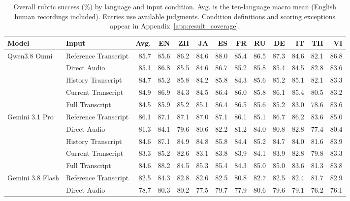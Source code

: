 \begin{table}[htbp]
\centering
\caption{Overall rubric success (\%) by language and input condition. Avg. is the ten-language macro mean (English human recordings included). Entries use available judgments. Condition definitions and scoring exceptions appear in Appendix~\ref{app:result_coverage}.}
\label{tab:rubric_conditions}
\begingroup
\fontsize{8.2}{9.1}\selectfont
\setlength{\tabcolsep}{1pt}
\renewcommand{\arraystretch}{1.06}
\begin{tabular*}{\linewidth}{@{}ll@{\extracolsep{\fill}}*{11}{r}@{}}
\toprule
\textbf{Model} & \textbf{Input} & \textbf{Avg.} & \textbf{EN} & \textbf{ZH} & \textbf{JA} & \textbf{ES} & \textbf{FR} & \textbf{RU} & \textbf{DE} & \textbf{IT} & \textbf{TH} & \textbf{VI} \\
\midrule
Qwen3.8 Omni & Reference Transcript & 85.7 & 85.6 & 86.2 & 84.6 & 88.0 & 85.4 & 86.5 & 87.3 & 84.6 & 82.1 & 86.8 \\
 & Direct Audio & 85.1 & 86.8 & 85.5 & 84.6 & 86.7 & 85.2 & 85.8 & 85.4 & 84.5 & 82.8 & 83.6 \\
 & History Transcript & 84.7 & 85.2 & 85.8 & 84.2 & 85.8 & 84.3 & 85.6 & 85.2 & 85.1 & 82.1 & 83.3 \\
 & Current Transcript & 84.9 & 86.9 & 84.3 & 84.5 & 86.4 & 86.0 & 85.8 & 86.1 & 85.4 & 80.5 & 83.2 \\
 & Full Transcript & 84.5 & 85.9 & 85.2 & 85.1 & 86.4 & 86.5 & 85.6 & 85.2 & 83.0 & 78.6 & 83.6 \\
\addlinespace[1pt]
\midrule
Gemini 3.1 Pro & Reference Transcript & 86.1 & 87.1 & 87.1 & 87.0 & 87.1 & 86.1 & 85.1 & 86.7 & 86.2 & 83.6 & 85.0 \\
 & Direct Audio & 81.3 & 84.1 & 79.6 & 80.6 & 82.2 & 81.2 & 84.0 & 80.8 & 82.8 & 77.4 & 80.4 \\
 & History Transcript & 84.6 & 87.1 & 84.9 & 84.8 & 85.8 & 84.4 & 85.2 & 84.7 & 84.0 & 81.6 & 83.9 \\
 & Current Transcript & 83.3 & 85.2 & 82.6 & 83.1 & 83.8 & 83.9 & 84.1 & 83.9 & 82.8 & 79.8 & 83.3 \\
 & Full Transcript & 84.6 & 88.2 & 84.5 & 85.3 & 85.4 & 84.3 & 85.0 & 85.0 & 83.6 & 81.3 & 83.8 \\
\addlinespace[1pt]
\midrule
Gemini 3.8 Flash & Reference Transcript & 82.5 & 84.3 & 82.8 & 82.6 & 82.5 & 80.8 & 82.7 & 82.5 & 82.4 & 81.7 & 82.9 \\
 & Direct Audio & 78.7 & 80.3 & 80.2 & 77.5 & 79.7 & 77.9 & 80.6 & 79.6 & 79.1 & 76.2 & 76.1 \\

\end{tabular*}
\end{table}
